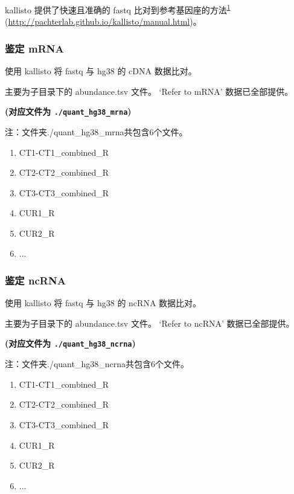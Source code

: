 \documentclass[
]{article}
\providecommand{\tightlist}{%
  \setlength{\itemsep}{0pt}\setlength{\parskip}{0pt}}
\begin{document}
kallisto 提供了快速且准确的 fastq 比对到参考基因座的方法\textsuperscript{\protect\hyperlink{ref-NearOptimalPrBray2016}{1}} (\url{http://pachterlab.github.io/kallisto/manual.html})。

\hypertarget{ux9274ux5b9a-mrna}{%
\subsubsection{鉴定 mRNA}\label{ux9274ux5b9a-mrna}}

使用 kallisto 将 fastq 与 hg38 的 cDNA 数据比对。

主要为子目录下的 abundance.tsv 文件。
`Refer to mRNA' 数据已全部提供。

\textbf{(对应文件为 \texttt{./quant\_hg38\_mrna})}

\begin{center}\begin{tcolorbox}[colback=gray!10, colframe=gray!50, width=0.9\linewidth, arc=1mm, boxrule=0.5pt]注：文件夹./quant\_hg38\_mrna共包含6个文件。

\begin{enumerate}\tightlist
\item CT1-CT1\_combined\_R
\item CT2-CT2\_combined\_R
\item CT3-CT3\_combined\_R
\item CUR1\_R
\item CUR2\_R
\item ...
\end{enumerate}\end{tcolorbox}
\end{center}

\hypertarget{ux9274ux5b9a-ncrna}{%
\subsubsection{鉴定 ncRNA}\label{ux9274ux5b9a-ncrna}}

使用 kallisto 将 fastq 与 hg38 的 ncRNA 数据比对。

主要为子目录下的 abundance.tsv 文件。
`Refer to ncRNA' 数据已全部提供。

\textbf{(对应文件为 \texttt{./quant\_hg38\_ncrna})}

\begin{center}\begin{tcolorbox}[colback=gray!10, colframe=gray!50, width=0.9\linewidth, arc=1mm, boxrule=0.5pt]注：文件夹./quant\_hg38\_ncrna共包含6个文件。

\begin{enumerate}\tightlist
\item CT1-CT1\_combined\_R
\item CT2-CT2\_combined\_R
\item CT3-CT3\_combined\_R
\item CUR1\_R
\item CUR2\_R
\item ...
\end{enumerate}\end{tcolorbox}
\end{center}
\end{document}
